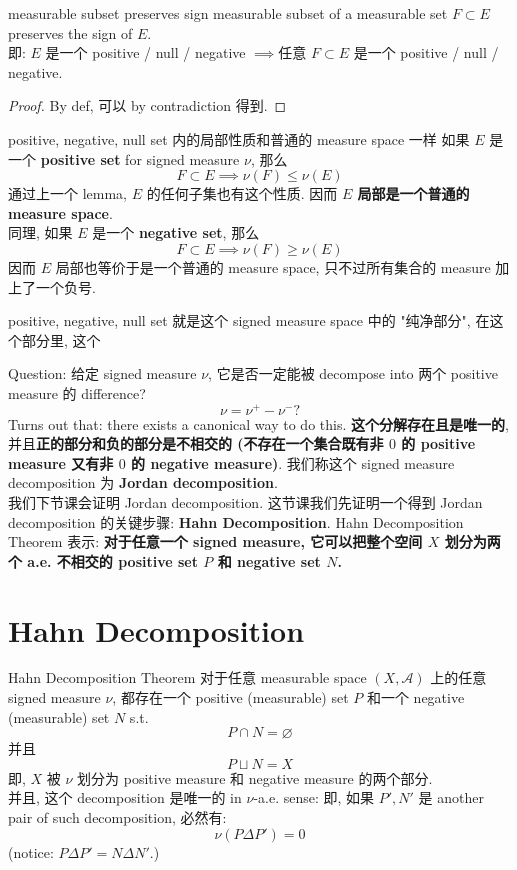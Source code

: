 \documentclass[lang=cn,11pt]{elegantbook}
\begin{document}
\begin{lemma}{measurable subset preserves sign}
measurable subset of a measurable set $F\subset E$ preserves the sign of $E$.\\
即: $E$ 是一个 positive / null / negative $\implies$任意 $F \subset E$ 是一个 positive / null / negative.
\end{lemma}
\begin{proof}
By def, 可以 by contradiction 得到.
\end{proof}


\begin{lemma}{positive, negative, null set 内的局部性质和普通的 measure space 一样}
如果 $E$ 是一个\textbf{ positive set} for signed measure $\nu$, 那么 \[
F \subset E \implies \nu (F) \leq \nu (E)
\]
通过上一个 lemma, $E$ 的任何子集也有这个性质. 因而 \textbf{$E$ 局部是一个普通的 measure space}. \\
同理, 如果 $E$  是一个\textbf{ negative set}, 那么 \[
F \subset E \implies \nu (F) \geq \nu (E)
\]
因而 $E$ 局部也等价于是一个普通的 measure space, 只不过所有集合的 measure 加上了一个负号.
\end{lemma}
\begin{remark}
    positive, negative, null set 就是这个 signed measure space 中的 "纯净部分", 在这个部分里, 这个 
\end{remark}



Question:
给定 signed measure $\nu$, 它是否一定能被 decompose into 两个 positive measure 的 difference? \[
\nu  = \nu ^+ - \nu^- ?
\]
Turns out that: there exists a canonical way to do this. \textbf{这个分解存在且是唯一的}, 并且\textbf{正的部分和负的部分是不相交的 (不存在一个集合既有非 $0$ 的 positive measure 又有非 $0$ 的 negative measure)}. 我们称这个 signed measure decomposition 为\textbf{ Jordan decomposition}.\\

我们下节课会证明 Jordan decomposition. 这节课我们先证明一个得到 Jordan decomposition 的关键步骤: \textbf{Hahn Decomposition}. Hahn Decomposition Theorem 表示: \textbf{对于任意一个 signed measure, 它可以把整个空间 $X$ 划分为两个 a.e. 不相交的 positive set $P$ 和 negative set $N$.}



\section{Hahn Decomposition}
\begin{theorem}{Hahn Decomposition Theorem}
对于任意 measurable space $(X,\mathcal{A})$ 上的任意 signed measure $\nu$, 都存在一个 positive (measurable) set $P$ 和一个 negative (measurable) set $N$ s.t. \[
P \cap N = \varnothing
\]
并且 \[
P \sqcup N = X
\]
即, $X$ 被 $\nu$ 划分为 positive measure 和 negative measure 的两个部分. \\
并且, 这个 decomposition 是唯一的 in $\nu$-a.e. sense: 即, 如果 $P',N'$ 是 another pair of such decomposition, 必然有: \[
\nu (P \Delta P')  = 0
\] (notice: $P\Delta P'= N \Delta N'$.)
\end{theorem}
\end{document}

